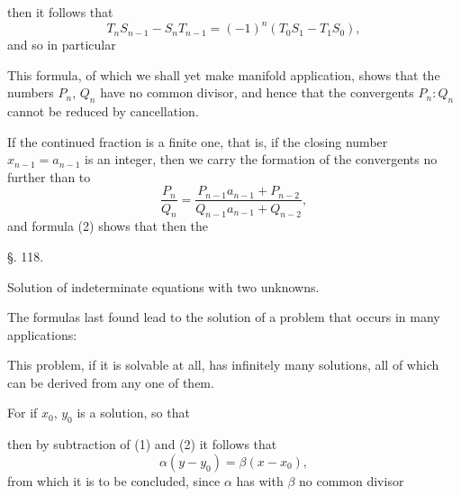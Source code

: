 then it follows that
\[
T_n S_{n-1} - S_n T_{n-1} = (-1)^n (T_0 S_1 - T_1 S_0),
\]
and so in particular


This formula, of which we shall yet make manifold application, shows that the numbers $P_n$, $Q_n$ have no common divisor, and hence that the convergents $P_n : Q_n$ cannot be reduced by cancellation.

If the continued fraction is a finite one, that is, if the closing number $x_{n-1} = a_{n-1}$ is an integer, then we carry the formation of the convergents no further than to
\[
\frac{P_n}{Q_n} = \frac{P_{n-1} a_{n-1} + P_{n-2}}{Q_{n-1} a_{n-1} + Q_{n-2}},
\]
and formula (2) shows that then the 

\begin{center}
§. 118.

Solution of indeterminate equations with two unknowns.
\end{center}

The formulas last found lead to the solution of a problem that occurs in many applications:



This problem, if it is solvable at all, has infinitely many solutions, all of which can be derived from any one of them.

For if $x_0$, $y_0$ is a solution, so that

then by subtraction of (1) and (2) it follows that
\[
\alpha (y - y_0) = \beta (x - x_0),
\]
from which it is to be concluded, since $\alpha$ has with $\beta$ no common divisor
